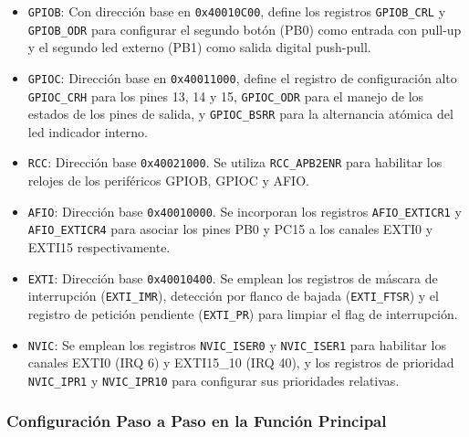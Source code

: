\begin{itemize}
    \item \texttt{GPIOB}: Con dirección base en \texttt{0x40010C00}, define los registros \texttt{GPIOB\_CRL}
    y \texttt{GPIOB\_ODR} para configurar el segundo botón (PB0) como entrada con pull-up y el segundo led
    externo (PB1) como salida digital push-pull.
    \item \texttt{GPIOC}: Dirección base en \texttt{0x40011000}, define el registro de configuración alto
    \texttt{GPIOC\_CRH} para los pines 13, 14 y 15, \texttt{GPIOC\_ODR} para el manejo de los estados de
    los pines de salida, y \texttt{GPIOC\_BSRR} para la alternancia atómica del led indicador interno.
    \item \texttt{RCC}: Dirección base \texttt{0x40021000}. Se utiliza \texttt{RCC\_APB2ENR} para habilitar
    los relojes de los periféricos GPIOB, GPIOC y AFIO.
    \item \texttt{AFIO}: Dirección base \texttt{0x40010000}. Se incorporan los registros \texttt{AFIO\_EXTICR1}
    y \texttt{AFIO\_EXTICR4} para asociar los pines PB0 y PC15 a los canales EXTI0 y EXTI15 respectivamente.
    \item \texttt{EXTI}: Dirección base \texttt{0x40010400}. Se emplean los registros de máscara de interrupción
    (\texttt{EXTI\_IMR}), detección por flanco de bajada (\texttt{EXTI\_FTSR}) y el registro de petición pendiente
    (\texttt{EXTI\_PR}) para limpiar el flag de interrupción.
    \item \texttt{NVIC}: Se emplean los registros \texttt{NVIC\_ISER0} y \texttt{NVIC\_ISER1} para habilitar los
    canales EXTI0 (IRQ 6) y EXTI15\_10 (IRQ 40), y los registros de prioridad \texttt{NVIC\_IPR1} y
    \texttt{NVIC\_IPR10} para configurar sus prioridades relativas.
\end{itemize}

\subsubsection{Configuración Paso a Paso en la Función Principal}

